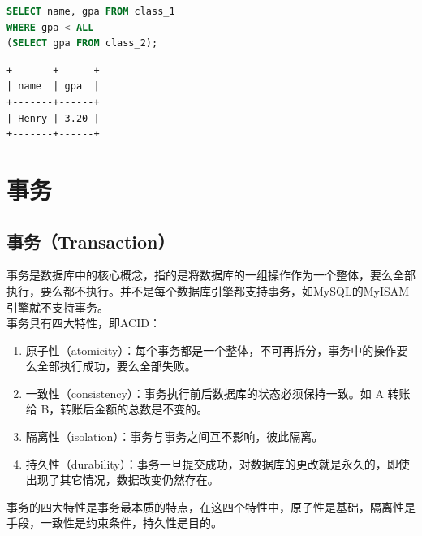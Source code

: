 \documentclass[12pt, openany, oneside]{book}
\begin{document}
\vspace{0.5cm}


\begin{lstlisting}[language=SQL]
SELECT name, gpa FROM class_1
WHERE gpa < ALL
(SELECT gpa FROM class_2);
\end{lstlisting}

\begin{tcolorbox}
	\begin{verbatim}
+-------+------+
| name  | gpa  |
+-------+------+
| Henry | 3.20 |
+-------+------+
	\end{verbatim}
\end{tcolorbox}

\newpage

\chapter{事务}

\section{事务（Transaction）}

事务是数据库中的核心概念，指的是将数据库的一组操作作为一个整体，要么全部执行，要么都不执行。并不是每个数据库引擎都支持事务，如MySQL的MyISAM引擎就不支持事务。\\

事务具有四大特性，即ACID：

\begin{enumerate}
	\item 原子性（atomicity）：每个事务都是一个整体，不可再拆分，事务中的操作要么全部执行成功，要么全部失败。

	\item 一致性（consistency）：事务执行前后数据库的状态必须保持一致。如 A 转账给 B，转账后金额的总数是不变的。

	\item 隔离性（isolation）：事务与事务之间互不影响，彼此隔离。

	\item 持久性（durability）：事务一旦提交成功，对数据库的更改就是永久的，即使出现了其它情况，数据改变仍然存在。
\end{enumerate}

事务的四大特性是事务最本质的特点，在这四个特性中，原子性是基础，隔离性是手段，一致性是约束条件，持久性是目的。
\end{document}
